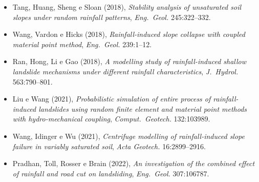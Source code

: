 \documentclass[11pt,a4paper]{article}
\numberwithin{equation}{section}
\begin{document}
\begin{itemize}
{landslides}, \emph{Eng.\ Geol.} 192:92--100.
\item Tang, Huang, Sheng e Sloan (2018), \emph{Stability analysis of unsaturated soil slopes under random rainfall
patterns}, \emph{Eng.\ Geol.} 245:322--332.
\item Wang, Vardon e Hicks (2018), \emph{Rainfall-induced slope collapse with coupled material point method},
\emph{Eng.\ Geol.} 239:1--12.
\item Ran, Hong, Li e Gao (2018), \emph{A modelling study of rainfall-induced shallow landslide mechanisms under
different rainfall characteristics}, \emph{J.\ Hydrol.} 563:790--801.
\item Liu e Wang (2021), \emph{Probabilistic simulation of entire process of rainfall-induced landslides using random
finite element and material point methods with hydro-mechanical coupling}, \emph{Comput.\ Geotech.} 132:103989.
\item Wang, Idinger e Wu (2021), \emph{Centrifuge modelling of rainfall-induced slope failure in variably saturated
soil}, \emph{Acta Geotech.} 16:2899--2916.
\item Pradhan, Toll, Rosser e Brain (2022), \emph{An investigation of the combined effect of rainfall and road cut on
landsliding}, \emph{Eng.\ Geol.} 307:106787.
\end{itemize}
\end{document}
